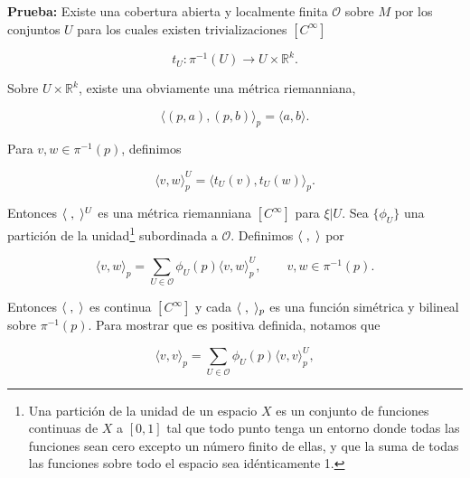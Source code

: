 \documentclass[a4paper,10pt]{article}
\numberwithin{equation}{section}
\newcommand{\prueba}{\textbf{Prueba: }}
\begin{document}
\vspace{.3cm}

\prueba Existe una cobertura abierta y localmente finita $\mathcal{O}$ sobre 
$M$ por los conjuntos $U$ para los cuales existen trivializaciones $[C^\infty]$

\begin{equation}
 t_U: \pi^{-1}(U) \rightarrow U \times \mathbb{R}^k.
\end{equation}

Sobre $U \times \mathbb{R}^k$, existe una obviamente una métrica riemanniana,

\begin{equation}
 \langle (p,a), (p,b)\rangle_p = \langle a, b \rangle. 
\end{equation}

Para $v,w \in \pi^{-1}(p)$, definimos

\begin{equation}
 \langle v, w \rangle_p^U = \langle t_U(v),t_U(w)\rangle_p.
\end{equation}

Entonces $\langle \hspace{.1cm} , \hspace{.1cm} \rangle^U$ es una métrica riemanniana
$[C^\infty]$ para $\xi|U$. Sea $\{\phi_U \}$ una partición de la unidad\footnote{ Una partición 
de la unidad de un espacio $X$ es un conjunto de funciones continuas de $X$ a $[0,1]$ tal que todo punto 
tenga un entorno donde todas las funciones sean cero excepto un número finito de ellas, y que la 
suma de todas las funciones sobre todo el espacio sea idénticamente 1.} 
subordinada a $\mathcal{O}$. Definimos $\langle \hspace{.1cm}, \hspace{.1cm} \rangle$ por 

\begin{equation}
 \langle v, w \rangle_p = \sum_{U \in \mathcal{O}} \phi_U(p)\langle v, w \rangle_p^U, 
 \qquad v,w \in \pi^{-1}(p).
\end{equation}

Entonces $\langle \hspace{.1cm}, \hspace{.1cm} \rangle$ es continua $[C^\infty]$ y 
cada $\langle \hspace{.1cm}, \hspace{.1cm} \rangle_p$ es una función simétrica y 
bilineal sobre $\pi^{-1}(p)$. Para mostrar que es positiva definida, 
notamos que 

\begin{equation}
 \langle v, v \rangle_p =  \sum_{U \in \mathcal{O}} \phi_U(p)\langle v, v \rangle_p^U,
\end{equation}
\end{document}
